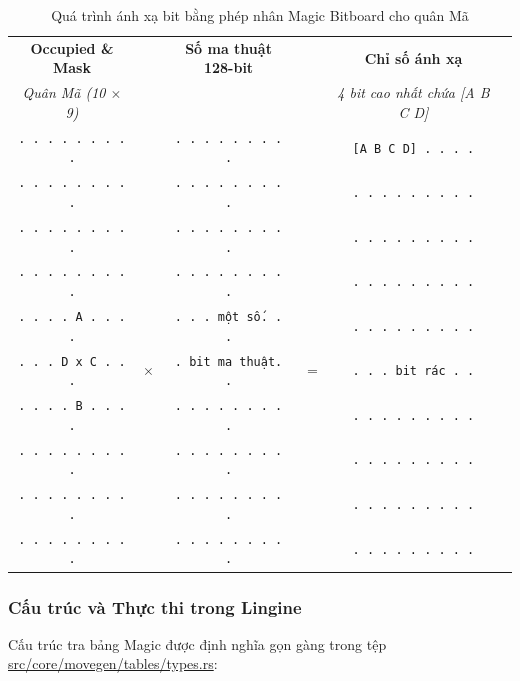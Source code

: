 \begin{table}[htbp]
    \centering
    \small %
    \setlength{\tabcolsep}{4pt} %
    \begin{tabular}{cccccc}
        \textbf{Occupied \& Mask} & & \textbf{Số ma thuật 128-bit} & & \textbf{Chỉ số ánh xạ} & \\
        \textit{Quân Mã (10 $\times$ 9)} & & & & \textit{4 bit cao nhất chứa [A B C D]} & \\
        \texttt{. . . . . . . . .} & & \texttt{. . . . . . . . .} & & \texttt{[A B C D] . . . .} & \\
        \texttt{. . . . . . . . .} & & \texttt{. . . . . . . . .} & & \texttt{. . . . . . . . .} & \\
        \texttt{. . . . . . . . .} & & \texttt{. . . . . . . . .} & & \texttt{. . . . . . . . .} & \\
        \texttt{. . . . . . . . .} & & \texttt{. . . . . . . . .} & & \texttt{. . . . . . . . .} & \\
        \texttt{. . . . A . . . .} & & \texttt{. . . một số. . .} & & \texttt{. . . . . . . . .} & \\
        \texttt{. . . D x C . . .} & $\times$ & \texttt{. bit ma thuật. .} & $=$ & \texttt{. . . bit rác . .} &  \\
        \texttt{. . . . B . . . .} & & \texttt{. . . . . . . . .} & & \texttt{. . . . . . . . .} & \\
        \texttt{. . . . . . . . .} & & \texttt{. . . . . . . . .} & & \texttt{. . . . . . . . .} & \\
        \texttt{. . . . . . . . .} & & \texttt{. . . . . . . . .} & & \texttt{. . . . . . . . .} & \\
        \texttt{. . . . . . . . .} & & \texttt{. . . . . . . . .} & & \texttt{. . . . . . . . .} & \\
    \end{tabular}
    \caption{Quá trình ánh xạ bit bằng phép nhân Magic Bitboard cho quân Mã}
\end{table}

\subsubsection{Cấu trúc và Thực thi trong Lingine}

Cấu trúc tra bảng Magic được định nghĩa gọn gàng trong tệp \url{src/core/movegen/tables/types.rs}:

